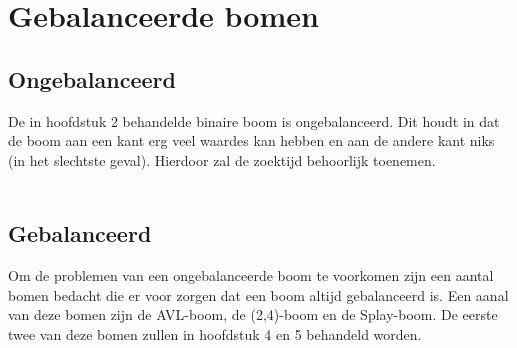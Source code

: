 \chapter{Gebalanceerde bomen}
\label{sec:Hoofdstuk 3}

\section{Ongebalanceerd}
De in hoofdstuk 2 behandelde binaire boom is ongebalanceerd. Dit houdt in dat de boom aan een kant erg veel waardes kan hebben en aan de andere kant niks (in het slechtste geval). Hierdoor zal de zoektijd behoorlijk toenemen.\\
\\
\section{Gebalanceerd}
Om de problemen van een ongebalanceerde boom te voorkomen zijn een aantal bomen bedacht die er voor zorgen dat een boom altijd gebalanceerd is. Een aanal van deze bomen zijn de AVL-boom, de (2,4)-boom en de Splay-boom. De eerste twee van deze bomen zullen in hoofdstuk 4 en 5 behandeld worden.\\

